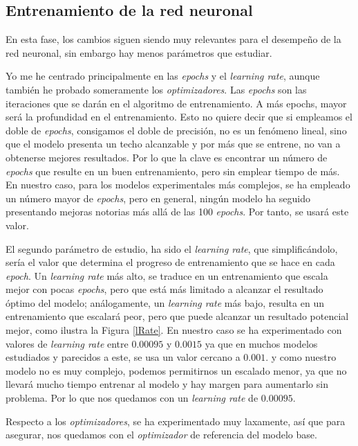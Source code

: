 \begin{appendices}
\subsection{Entrenamiento de la red neuronal\label{expTrainRN}}
En esta fase, los cambios siguen siendo muy relevantes para el desempeño de la red neuronal,
sin embargo hay menos parámetros que estudiar.

Yo me he centrado principalmente en las \textit{epochs} y el \textit{learning rate}, aunque
también he probado someramente los \textit{optimizadores}.
Las \textit{epochs} son las iteraciones que se darán en el algoritmo de entrenamiento.
A más epochs, mayor será la profundidad en el entrenamiento.
Esto no quiere decir que si empleamos el doble de \textit{epochs}, consigamos el doble
de precisión, no es un fenómeno lineal, sino que el modelo presenta un techo
alcanzable y por más que se entrene, no van a obtenerse mejores resultados. Por lo que
la clave es encontrar un número de \textit{epochs} que resulte en un buen entrenamiento,
pero sin emplear tiempo de más. En nuestro caso, para los modelos experimentales más complejos,
se ha empleado un número mayor de \textit{epochs}, pero en general, ningún modelo ha seguido
presentando mejoras notorias más allá de las 100 \textit{epochs}. Por tanto, se usará este valor.

El segundo parámetro de estudio, ha sido el \textit{learning rate}, que simplificándolo,
sería el valor que determina el progreso de entrenamiento que se hace en cada \textit{epoch}.
Un \textit{learning rate} más alto, se traduce en un entrenamiento que escala mejor con pocas
\textit{epochs}, pero que está más limitado a alcanzar el resultado óptimo del modelo;
análogamente, un \textit{learning rate} más bajo, resulta en un entrenamiento que
escalará peor, pero que puede alcanzar un resultado potencial mejor, como ilustra la Figura \ref{lRate}.
En nuestro caso se ha experimentado con valores de \textit{learning rate} entre $0.00095$ y $0.0015$
ya que en muchos modelos estudiados y parecidos a este, se usa un valor cercano a $0.001$.
y como nuestro modelo no es muy complejo, podemos permitirnos un escalado menor, ya que no llevará
mucho tiempo entrenar al modelo y hay margen para aumentarlo sin problema. Por lo que
nos quedamos con un \textit{learning rate} de $0.00095$.

Respecto a los \textit{optimizadores}, se ha experimentado muy laxamente, así que para asegurar,
nos quedamos con el \textit{optimizador} de referencia del modelo base.


\end{appendices}
